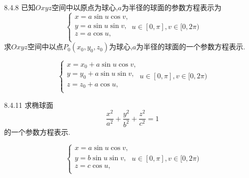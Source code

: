 \begin{exercise}{8.4.8}
    已知$Oxyz$空间中以原点为球心,$a$为半径的球面的参数方程表示为
    $$\begin{cases}
        x=a\sin u\cos v,\\
        y=a\sin u\sin v,\\
        z=a\cos u,\\
    \end{cases}u\in[0,\pi],v\in[0,2\pi)$$
    求$Oxyz$空间中以点$P_0(x_0,y_0,z_0)$为球心,$a$为半径的球面的一个参数方程表示.
\end{exercise}
\begin{solution}
    $$\begin{cases}
        x=x_0+a\sin u\cos v,\\
        y=y_0+a\sin u\sin v,\\
        z=z_0+a\cos u,\\
    \end{cases}u\in[0,\pi],v\in[0,2\pi)$$
\end{solution}

\begin{exercise}{8.4.11}
    求椭球面$$\frac{x^2}{a^2}+\frac{y^2}{b^2}+\frac{z^2}{c^2}=1$$的一个参数方程表示.
\end{exercise}
\begin{solution}
    $$\begin{cases}
        x=a\sin u\cos v,\\
        y=b\sin u\sin v,\\
        z=c\cos u,\\
    \end{cases}u\in[0,\pi],v\in[0,2\pi)$$
\end{solution}

